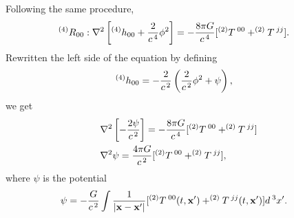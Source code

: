 Following the same procedure,
\begin{align}
&^{(4)}R_{00}: \nabla^2\left[^{(4)}h_{00}+\frac{2}{c^{\hspace{0.05cm}4}}\phi^2\right] = -\frac{8\pi G}{c^{\hspace{0.05cm}4}}{}[^{(2)}T{}^{\hspace{0.07cm}00} + ^{(2)}T{}^{\hspace{0.07cm}jj}].
\end{align}
Rewritten the left side of the equation by defining
\begin{align}
\label{eq: hoo4newton}
&^{(4)}h_{00} = -\frac{2}{c^{\hspace{0.05cm}2}}\left(\frac{2}{c^{\hspace{0.05cm}2}}\phi^2+\psi \right),
\end{align}
we get
\begin{align}
&\nabla^2\left[-\frac{2\psi}{c^{\hspace{0.05cm}2}}\right] = -\frac{8\pi G}{c^{\hspace{0.05cm}4}}{}[^{(2)}T{}^{\hspace{0.07cm}00} + ^{(2)}T{}^{\hspace{0.07cm}jj}]\\
&\nabla^2\psi = \frac{4\pi G}{c^{\hspace{0.05cm}2}}{}[^{(2)}T{}^{\hspace{0.07cm}00} + ^{(2)}T{}^{\hspace{0.07cm}jj}],
\end{align}
where $\psi$ is the potential
\begin{align}
\label{eq: psipotential4hoo}
&\psi = -\frac{G}{c^{\hspace{0.05cm}2}}\int \frac{1}{|\mathbf{x}-\mathbf{x'}|}{}[^{(2)}T{}^{\hspace{0.07cm}00}(t,\mathbf{x'})+^{(2)}T{}^{\hspace{0.07cm}jj}(t,\mathbf{x'})]d^{\hspace{0.07cm}3}x'.
\end{align}

